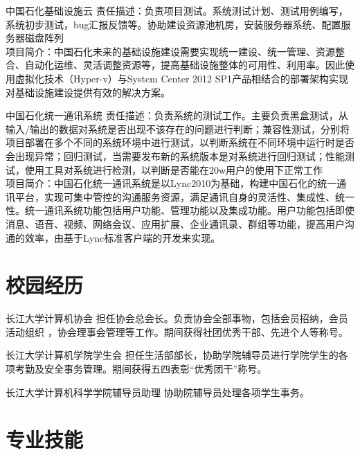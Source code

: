 \documentclass[11pt,a4paper]{moderncv}
\begin{document}
{中国石化基础设施云}
{}
{}{}
{责任描述：负责项目测试。系统测试计划、测试用例编写，系统初步测试，bug汇报反馈等。协助建设资源池机房，安装服务器系统、配置服务器磁盘阵列\\
项目简介：中国石化未来的基础设施建设需要实现统一建设、统一管理、资源整合、自动化运维、灵活调整资源等，提高基础设施整体的可用性、利用率。因此使用虚拟化技术（Hyper-v）与System Center 2012 SP1产品相结合的部署架构实现对基础设施建设提供有效的解决方案。}

{中国石化统一通讯系统}
{}
{}{}
{责任描述：负责系统的测试工作。主要负责黑盒测试，从输入/输出的数据对系统是否出现不该存在的问题进行判断；兼容性测试，分别将项目部署在多个不同的系统环境中进行测试，以判断系统在不同环境中运行时是否会出现异常；回归测试，当需要发布新的系统版本是对系统进行回归测试；性能测试，使用工具对系统进行检测，以判断是否能在20w用户的使用下正常工作\\
项目简介：中国石化统一通讯系统是以Lync2010为基础，构建中国石化的统一通讯平台，实现可集中管控的沟通服务资源，满足通讯自身的灵活性、集成性、统一性。统一通讯系统功能包括用户功能、管理功能以及集成功能。用户功能包括即使消息、语音、视频、网络会议、应用扩展、企业通讯录、群组等功能，提高用户沟通的效率，由基于Lync标准客户端的开发来实现。
}

\section{校园经历}
\renewcommand{\baselinestretch}{1.2}

{长江大学计算机协会}
{}
{}{}
{担任协会总会长。负责协会全部事物，包括会员招纳，会员活动组织 ，协会理事会管理等工作。期间获得社团优秀干部、先进个人等称号。}

{长江大学计算机学院学生会}
{}
{}{}
{担任生活部部长，协助学院辅导员进行学院学生的各项考勤及安全事务管理。期间获得五四表彰“优秀团干”称号。}

{长江大学计算机科学学院辅导员助理}
{}
{}{}
{协助院辅导员处理各项学生事务。}



\section{专业技能}
\end{document}
